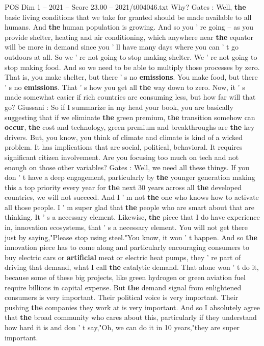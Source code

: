 \begin{textsample}{POS Dim 1 – 2021 – Score 23.00 – 2021/t004046.txt}
Why?
Gates : Well, \textbf{the} basic living conditions that we take for granted should be made available to all humans.
And \textbf{the} human population is growing.
And so you ' re going -- as you provide shelter, heating and air conditioning, which anywhere near \textbf{the} equator will be more in demand since you ' ll have many days where you can ' t go outdoors at all.
So we ' re not going to stop making shelter.
We ' re not going to stop making food.
And so we need to be able to multiply those processes by zero.
That is, you make shelter, but there ' s no \textbf{emissions}.
You make food, but there ' s no \textbf{emissions}.
That ' s how you get all \textbf{the} way down to zero.
Now, it ' s made somewhat easier if rich countries are consuming less, but how far will that go?
Giussani : So if I summarize in my head your book, you are basically suggesting that if we eliminate \textbf{the} green premium, \textbf{the} transition somehow can \textbf{occur}, \textbf{the} cost and technology, green premium and breakthroughs are \textbf{the} key drivers.
But, you know, you think of climate and climate is kind of a wicked problem.
It has implications that are social, political, behavioral.
It requires significant citizen involvement.
Are you focusing too much on tech and not enough on those other variables?
Gates : Well, we need all these things.
If you don ' t have a deep engagement, particularly by \textbf{the} younger generation making this a top priority every year for \textbf{the} next 30 years across all \textbf{the} developed countries, we will not succeed.
And I ' m not \textbf{the} one who knows how to activate all those people.
I ' m super glad that \textbf{the} people who are smart about that are thinking.
It ' s a necessary element.
Likewise, \textbf{the} piece that I do have experience in, innovation ecosystems, that ' s a necessary element.
You will not get there just by saying,"Please stop using steel."You know, it won ' t happen.
And so \textbf{the} innovation piece has to come along and particularly encouraging consumers to buy electric cars or \textbf{artificial} meat or electric heat pumps, they ' re part of driving that demand, what I call \textbf{the} catalytic demand.
That alone won ' t do it, because some of these big projects, like green hydrogen or green aviation fuel require billions in capital expense.
But \textbf{the} demand signal from enlightened consumers is very important.
Their political voice is very important.
Their pushing \textbf{the} companies they work at is very important.
And so I absolutely agree that \textbf{the} broad community who cares about this, particularly if they understand how hard it is and don ' t say,"Oh, we can do it in 10 years,"they are super important.

\end{textsample}
